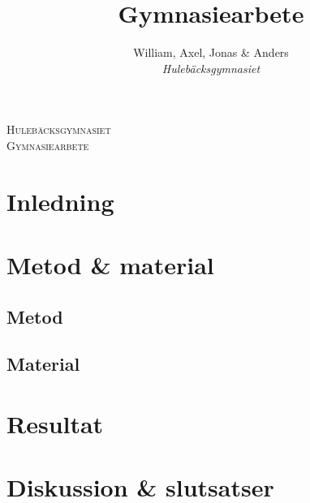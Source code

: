 \documentclass[]{article}
\title{Gymnasiearbete}
\author{William, Axel, Jonas \& Anders \\
\emph{Hulebäcksgymnasiet}}
\begin{document}
\begin{titlepage}
	\centering

	\vspace{5cm}
	{\scshape\LARGE Hulebäcksgymnasiet} \\
	\vspace{2cm}
	{\scshape\Large Gymnasiearbete}

\end{titlepage}

\section{Inledning}



\section{Metod \& material}

\subsection{Metod}

\subsection{Material}

\section{Resultat}

\section{Diskussion \& slutsatser}
\end{document}
